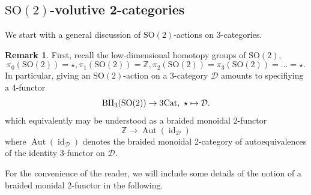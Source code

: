 \documentclass{article}
\newcommand{\id}{\operatorname{id}}%
\newcommand{\Cat}{\operatorname{Cat}}%
\newcommand{\Aut}{\operatorname{Aut}}%
\newcommand{\Sotwo}{\operatorname{SO(2)}}
\newcommand{\D}{\mathcal{D}}
\newcommand{\Z}{\mathbb{Z}}
\numberwithin{equation}{section}
\theoremstyle{definition}
\newtheorem{remark}[definition]{Remark}
\theoremstyle{theorem}
\begin{document}
\subsection{$\Sotwo$-volutive 2-categories}
We start with a general discussion of $\Sotwo$-actions on 3-categories. 
\begin{remark}\label{Remark: Sotwo actions on 3-categories}
First, recall the low-dimensional homotopy groups of $\Sotwo$, 
\begin{equation}
    \pi_0(\Sotwo) = \star, \pi_1(\Sotwo) = \mathbb{Z}, \pi_2(\Sotwo) = \pi_3(\Sotwo) = \dotsc = \star.
\end{equation}
In particular, giving an $\Sotwo$-action on a 3-category $\D$ amounts to specifiying a 4-functor 
\begin{equation}
    \mathrm{B}\Pi_3(\Sotwo) \to 3\hspace{-0.05cm}\Cat, \ \star \mapsto \D.
\end{equation}
which equivalently may be understood as a braided monoidal 2-functor 
\begin{equation}
    \Z \to \Aut(\id_{\D})
\end{equation}
where $\Aut(\id_{\D})$ denotes the braided monoidal 2-category of autoequivalences of the identity 3-functor on $\D$. 
\end{remark}
For the convenience of the reader, we will include some details of the notion of a braided monidal 2-functor in the following. 
\end{document}
